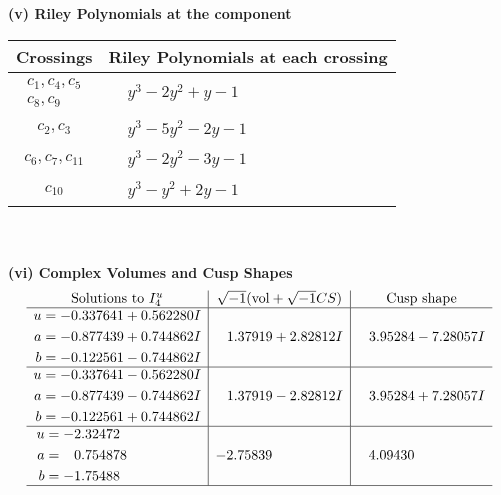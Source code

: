 \documentclass[1p]{elsarticle_modified}
\theoremstyle{definition}
\newcommand{\I}{\sqrt{-1}}
\begin{document}
\newpage\renewcommand{\arraystretch}{1}
\flushleft \textbf{(v) Riley Polynomials at the component}\newline \\
\begin{tabular}{m{50pt}|m{274pt}}
Crossings & \hspace{64pt}Riley Polynomials at each crossing \\
\hline $$\begin{aligned}c_{1},c_{4},c_{5}\\c_{8},c_{9}\end{aligned}$$&$\begin{aligned}
&y^3-2 y^2+y-1
\end{aligned}$\\
\hline $$\begin{aligned}c_{2},c_{3}\end{aligned}$$&$\begin{aligned}
&y^3-5 y^2-2 y-1
\end{aligned}$\\
\hline $$\begin{aligned}c_{6},c_{7},c_{11}\end{aligned}$$&$\begin{aligned}
&y^3-2 y^2-3 y-1
\end{aligned}$\\
\hline $$\begin{aligned}c_{10}\end{aligned}$$&$\begin{aligned}
&y^3- y^2+2 y-1
\end{aligned}$\\
\hline
\end{tabular}\\~\\
\newpage\flushleft \textbf{(vi) Complex Volumes and Cusp Shapes}
$$\begin{array}{c|c|c}  
\text{Solutions to }I^u_{4}& \I (\text{vol} + \sqrt{-1}CS) & \text{Cusp shape}\\
 \hline 
\begin{aligned}
u &= -0.337641 + 0.562280 I \\
a &= -0.877439 + 0.744862 I \\
b &= -0.122561 - 0.744862 I\end{aligned}
 & \phantom{-}1.37919 + 2.82812 I & \phantom{-}3.95284 - 7.28057 I \\ \hline\begin{aligned}
u &= -0.337641 - 0.562280 I \\
a &= -0.877439 - 0.744862 I \\
b &= -0.122561 + 0.744862 I\end{aligned}
 & \phantom{-}1.37919 - 2.82812 I & \phantom{-}3.95284 + 7.28057 I \\ \hline\begin{aligned}
u &= -2.32472\phantom{ +0.000000I} \\
a &= \phantom{-}0.754878\phantom{ +0.000000I} \\
b &= -1.75488\phantom{ +0.000000I}\end{aligned}
 & -2.75839\phantom{ +0.000000I} & \phantom{-}4.09430\phantom{ +0.000000I}\\
 \hline 
 \end{array}$$\newpage
\end{document}
